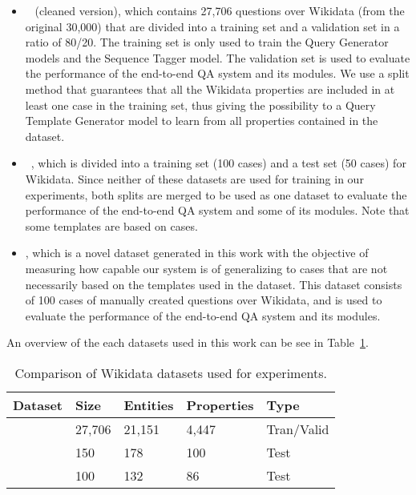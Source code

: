 \begin{itemize}
    \item \LCQuADtwo{}~\cite{dataset:lcquad2-DubeyBA019} (cleaned version), which contains 27,706 
    questions over Wikidata (from the original 30,000) that are divided into a training set and 
    a validation set in a ratio of 80/20. The training set is only used to train the Query 
    Generator models and the Sequence Tagger model. The validation set is used to evaluate the 
    performance of the end-to-end QA system and its modules. We use a split method that 
    guarantees that all the Wikidata properties are included in at least one case in the 
    training set, thus giving the possibility to a Query Template Generator model to learn from 
    all properties contained in the dataset.
    \item \QALDseven{}~\cite{dataset:qald7-UsbeckNHKRN17}, which is divided into a training set (100 
    cases) and a test set (50 cases) for Wikidata. Since neither of these datasets are used for 
    training in our experiments, both splits are merged to be used as one dataset to evaluate 
    the performance of the end-to-end QA system and some of its modules. Note that some \LCQuADtwo{} 
    templates are based on \QALDseven{} cases.
    \item \WikiSPARQL{}, which is a novel dataset generated in this work with the objective of 
    measuring how capable our system is of generalizing to cases that are not necessarily based on 
    the templates used in the \LCQuADtwo{} dataset. This dataset consists of 100 cases of manually 
    created questions over Wikidata, and is used to evaluate the performance of the end-to-end 
    QA system and its modules.
\end{itemize}

An overview of the each datasets used in this work can be see in Table~\ref{table:datasetsOverview}.

\begin{table}[h!]
    \centering
    \begin{tabular}{|l|l|l|l|l|}
    \hline
    \textbf{Dataset} & \textbf{Size} & \textbf{Entities} & \textbf{Properties} & \textbf{Type} \\ \hline
    \LCQuADtwo{}        & 27,706        & 21,151            & 4,447               & Tran/Valid    \\ \hline
    \QALDseven{}           & 150           & 178               & 100                 & Test          \\ \hline
    \WikiSPARQL{}       & 100           & 132               & 86                  & Test          \\ \hline
    \end{tabular}
    \caption{Comparison of Wikidata datasets used for experiments.}
    \label{table:datasetsOverview}
\end{table}


